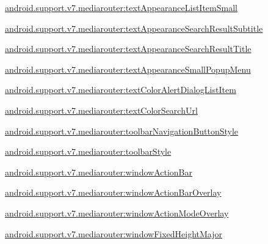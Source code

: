 {\ttfamily \hyperlink{classandroid_1_1support_1_1v7_1_1mediarouter_1_1R_1_1styleable_abfe06fe93e65f2145a7481cd483217d0}{android.\+support.\+v7.\+mediarouter\+:text\+Appearance\+List\+Item\+Small}}

{\ttfamily \hyperlink{classandroid_1_1support_1_1v7_1_1mediarouter_1_1R_1_1styleable_a505319de1733441b256077401041e226}{android.\+support.\+v7.\+mediarouter\+:text\+Appearance\+Search\+Result\+Subtitle}}

{\ttfamily \hyperlink{classandroid_1_1support_1_1v7_1_1mediarouter_1_1R_1_1styleable_a145215c955a16a489e091f3192f05b55}{android.\+support.\+v7.\+mediarouter\+:text\+Appearance\+Search\+Result\+Title}}

{\ttfamily \hyperlink{classandroid_1_1support_1_1v7_1_1mediarouter_1_1R_1_1styleable_aa0894f67d2b6095af2c79e757016f8ef}{android.\+support.\+v7.\+mediarouter\+:text\+Appearance\+Small\+Popup\+Menu}}

{\ttfamily \hyperlink{classandroid_1_1support_1_1v7_1_1mediarouter_1_1R_1_1styleable_a02d892ae076bbe1feac3d55796e9bca8}{android.\+support.\+v7.\+mediarouter\+:text\+Color\+Alert\+Dialog\+List\+Item}}

{\ttfamily \hyperlink{classandroid_1_1support_1_1v7_1_1mediarouter_1_1R_1_1styleable_a836d3802c62c78eac8fe21e652c6263b}{android.\+support.\+v7.\+mediarouter\+:text\+Color\+Search\+Url}}

{\ttfamily \hyperlink{classandroid_1_1support_1_1v7_1_1mediarouter_1_1R_1_1styleable_a354b2153b08d409c7335a25b06bf98e2}{android.\+support.\+v7.\+mediarouter\+:toolbar\+Navigation\+Button\+Style}}

{\ttfamily \hyperlink{classandroid_1_1support_1_1v7_1_1mediarouter_1_1R_1_1styleable_ad3fea9f4d259e9e79e8d8f944d3f692b}{android.\+support.\+v7.\+mediarouter\+:toolbar\+Style}}

{\ttfamily \hyperlink{classandroid_1_1support_1_1v7_1_1mediarouter_1_1R_1_1styleable_ad5254bfaca20d46ec980af0056e2a282}{android.\+support.\+v7.\+mediarouter\+:window\+Action\+Bar}}

{\ttfamily \hyperlink{classandroid_1_1support_1_1v7_1_1mediarouter_1_1R_1_1styleable_a3ed10a138c0c8928988e19b890aec7f7}{android.\+support.\+v7.\+mediarouter\+:window\+Action\+Bar\+Overlay}}

{\ttfamily \hyperlink{classandroid_1_1support_1_1v7_1_1mediarouter_1_1R_1_1styleable_ae55a9de1cb75512d04d62f878dcfefc3}{android.\+support.\+v7.\+mediarouter\+:window\+Action\+Mode\+Overlay}}

{\ttfamily \hyperlink{classandroid_1_1support_1_1v7_1_1mediarouter_1_1R_1_1styleable_a7f07a96e9dd77caa12d1744db19f037d}{android.\+support.\+v7.\+mediarouter\+:window\+Fixed\+Height\+Major}}

